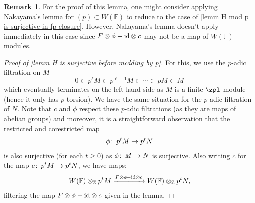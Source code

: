\documentclass[english,10pt]{amsart}
\newcommand{\field}{\mathbb{F}}
\theoremstyle{definition}
\newtheorem{rema}{Remark}[section]
\numberwithin{equation}{section}
\def\co{\colon\thinspace}
\begin{document}
\begin{rema}
For the proof of this lemma, one might consider applying Nakayama's lemma for $(p) \subset W(\field)$ to reduce to the case of \autoref{lemm H mod p is surjective in fp closure}. However,  Nakayama's lemma  doesn't apply immediately in this case since $F \otimes \phi-\textup{id}\otimes c$ may not be a map of $W(\field)$-modules. 
\end{rema}
\begin{proof}[Proof of \autoref{lemm H  is surjective before modding by p}]
For this, we use the $p$-adic filtration on $M$
\[
0 \subset p^\ell M \subset p^{\ell-1}M \subset \cdots \subset pM \subset M
\]
which eventually terminates on the left hand side as $M$ is a finite $\zpl$-module (hence it only has $p$-torsion). We have the same situation for the $p$-adic filtration of $N$. Note that $c$ and $\phi$ respect these $p$-adic filtrations (as they are maps of abelian groups) and moreover, it is a straightforward observation that the restricted and corestricted map 
\begin{equation}\label{eq phi is surjective on the padic filtration}
\phi \co p^t M \to p^t N
\end{equation}
is also surjective (for each $t \geq 0$) as $\phi \co M \to N$ is surjective. Also writing $c$ for the map $c\co p^t M\to p^tN$, we have maps:
\[W(\field)  \otimes_{\mathbb{Z}} p^t M \xrightarrow{F \otimes \phi - \textup{id} \otimes c} W(\field)  \otimes_{\mathbb{Z}} p^tN,\]
filtering the map $F \otimes \phi - \textup{id} \otimes c$ given in the lemma.


\end{proof}
\end{document}
